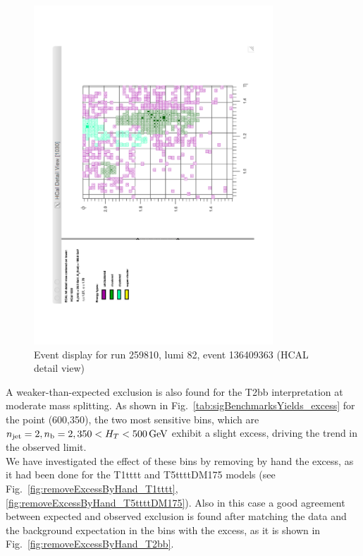 \begin{figure}[tbhp]
  \caption{Event display for run 259810, lumi 82, event 136409363 (HCAL detail view)}
  \label{fig:cmsShow_003}
  \begin{center}    
    \includegraphics[width=0.8\textwidth]{figures/susyResults/cmsShow_003}
  \end{center}
\end{figure}

A weaker-than-expected exclusion is also found for the T2bb interpretation at moderate mass splitting. 
As shown in Fig.~\ref{tab:sigBenchmarksYields_excess} for the point (600,350), the two most sensitive bins, 
which are $n_{\mathrm{jet}}=2,n_{\text{b}}=2,350<H_{T}<500\,\mathrm{GeV}$ exhibit a slight excess, driving the trend in the observed limit. \\
We have investigated the effect of these bins by removing by hand the excess, as it had been done 
for the T1tttt and T5ttttDM175 models (see Fig.~\ref{fig:removeExcessByHand_T1tttt},\ref{fig:removeExcessByHand_T5ttttDM175}).
Also in this case a good agreement between expected and observed exclusion is found after matching 
the data and the background expectation in the bins with the excess, as it is shown in Fig.~\ref{fig:removeExcessByHand_T2bb}.

